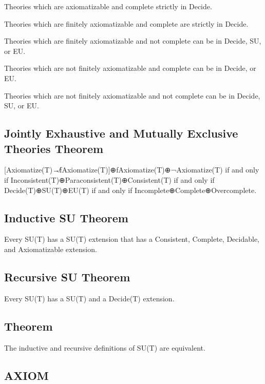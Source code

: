 Theories which are axiomatizable and complete strictly in Decide.

Theories which are finitely axiomatizable and complete are strictly in
Decide.

Theories which are finitely axiomatizable and not complete can be in
Decide, SU, or EU.

Theories which are not finitely axiomatizable and complete can be in
Decide, or EU.

Theories which are not finitely axiomatizable and not complete can be in
Decide, SU, or EU.

\hypertarget{jointly-exhaustive-and-mutually-exclusive-theories-theorem}{%
\subsection{Jointly Exhaustive and Mutually Exclusive Theories
Theorem}\label{jointly-exhaustive-and-mutually-exclusive-theories-theorem}}

{[}Axiomatize(T)↛fAxiomatize(T){]}⊕fAxiomatize(T)⊕¬Axiomatize(T) if and
only if Inconsistent(T)⊕Paraconsistent(T)⊕Consistent(T) if and only if
Decide(T)⊕SU(T)⊕EU(T) if and only if Incomplete⊕Complete⊕Overcomplete.

\hypertarget{inductive-su-theorem}{%
\subsection{Inductive SU Theorem}\label{inductive-su-theorem}}

Every SU(T) has a SU(T) extension that has a Consistent, Complete,
Decidable, and Axiomatizable extension.

\hypertarget{recursive-su-theorem}{%
\subsection{Recursive SU Theorem}\label{recursive-su-theorem}}

Every SU(T) has a SU(T) and a Decide(T) extension.

\hypertarget{theorem-8}{%
\subsection{Theorem}\label{theorem-8}}

The inductive and recursive definitions of SU(T) are equivalent.

\hypertarget{axiom}{%
\subsection{AXIOM}\label{axiom}}

